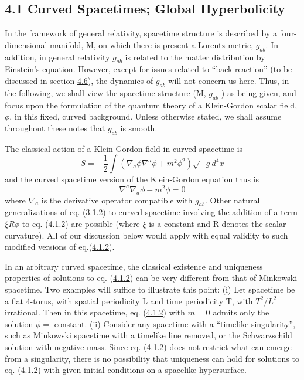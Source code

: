 \documentclass[11pt,a4paper]{article}
\begin{document}
\subsection*{4.1 Curved Spacetimes; Global Hyperbolicity}\hypertarget{sec:4.1}{}

In the framework of general relativity, spacetime structure is described by a four-dimensional manifold, M, on which there is present a Lorentz metric, \(g_{ab}\). In addition, in general relativity \(g_{ab}\) is related to the matter distribution by Einstein's equation. However, except for issues related to ``back-reaction'' (to be discussed in section \hyperlink{sec:4.6}{4.6}), the dynamics of \(g_{ab}\) will not concern us here. Thus, in the following, we shall view the spacetime structure (M, \(g_{ab}\) ) as being given, and focus upon the formulation of the quantum theory of a Klein-Gordon scalar field, \(\phi\), in this fixed, curved background. Unless otherwise stated, we shall assume throughout these notes that \(g_{ab}\) is smooth.

The classical action of a Klein-Gordon field in curved spacetime is
\begin{equation*}
S = -\frac{1}{2} \int (\nabla_a \phi \nabla^a \phi + m^2 \phi^2) \sqrt{-g} d^4x \tag{4.1.1}\label{eq:4.1.1}
\end{equation*}
and the curved spacetime version of the Klein-Gordon equation thus is
\begin{equation*}
\nabla^{a}\nabla_{a}\phi - m^{2}\phi = 0 \tag{4.1.2}\label{eq:4.1.2}
\end{equation*}
where \(\nabla_a\) is the derivative operator compatible with \(g_{ab}\). Other natural generalizations of eq. (\hyperref[eq:3.1.2]{3.1.2}) to curved spacetime involving the addition of a term \(\xi R \phi\) to eq. (\hyperref[eq:4.1.2]{4.1.2}) are possible (where \(\xi\) is a constant\hypertarget{source-68}{} and R denotes the scalar curvature). All of our discussion below would apply with equal validity to such modified versions of eq.(\hyperref[eq:4.1.2]{4.1.2}).

In an arbitrary curved spacetime, the classical existence and uniqueness properties of solutions to eq. (\hyperref[eq:4.1.2]{4.1.2}) can be very different from that of Minkowski spacetime. Two examples will suffice to illustrate this point: (i) Let spacetime be a flat 4-torus, with spatial periodicity L and time periodicity T, with \(T^2/L^2\) irrational. Then in this spacetime, eq. (\hyperref[eq:4.1.2]{4.1.2}) with \(m=0\) admits only the solution \(\phi=\) constant. (ii) Consider any spacetime with a ``timelike singularity'', such as Minkowski spacetime with a timelike line removed, or the Schwarzschild solution with negative mass. Since eq. (\hyperref[eq:4.1.2]{4.1.2}) does not restrict what can emerge from a singularity, there is no possibility that uniqueness can hold for solutions to eq. (\hyperref[eq:4.1.2]{4.1.2}) with given initial conditions on a spacelike hypersurface.
\end{document}
